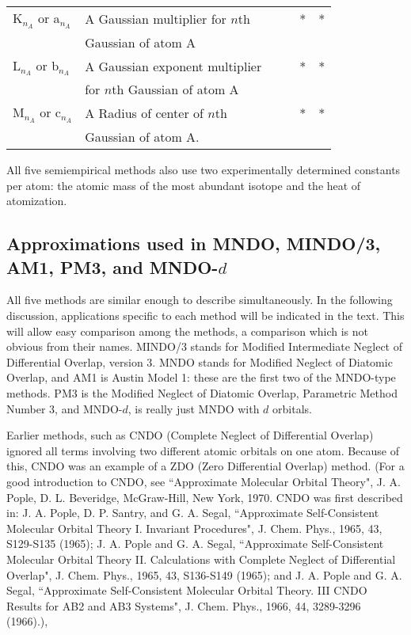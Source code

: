 \begin{table}
\begin{center}
\begin{tabular}{|l|l|cccc|}
K$_{n_A}$ or a$_{n_A}$ & A Gaussian multiplier for $n$th &  &&  *  &*  \\
&  Gaussian of atom A &&&& \\
L$_{n_A}$ or b$_{n_A}$ & A Gaussian exponent multiplier&   &&  * & *  \\
&  for $n$th Gaussian of atom A &&&& \\
M$_{n_A}$ or c$_{n_A}$ & A Radius of center of $n$th  && &   * & *  \\
&  Gaussian of atom A. &&&& \\ \hline
\end{tabular}
\end{center}
\end{table}

All five semiempirical methods also use two experimentally determined constants
per atom: the atomic mass of the most abundant isotope and the heat of
atomization.

\subsection{Approximations used in MNDO, MINDO/3, AM1, PM3, and MNDO-$d$}
All five methods are similar enough to describe simultaneously. In the
following discussion, applications specific to each method will be indicated in
the text. This will allow easy comparison among the methods, a comparison which
is not obvious from their names. MINDO/3 stands for Modified Intermediate
Neglect of Differential Overlap, version 3. MNDO stands for Modified Neglect of
Diatomic Overlap, and AM1 is Austin Model 1: these are the first two of  the
MNDO-type methods. PM3 is the Modified Neglect of Diatomic Overlap, Parametric
Method Number 3, and MNDO-$d$, is really just MNDO with $d$ orbitals.

Earlier methods, such as CNDO  (Complete Neglect of Differential Overlap) ignored all
terms involving two different atomic orbitals on one atom. Because of this, CNDO
was an example of a ZDO  (Zero Differential Overlap) method. (For a good
introduction to CNDO, see ``Approximate Molecular Orbital Theory", J. A. Pople,
D. L. Beveridge, McGraw-Hill, New York, 1970. CNDO was first described in: 
J. A. Pople, D. P. Santry, and G. A. Segal, ``Approximate Self-Consistent
Molecular Orbital Theory I. Invariant Procedures", J. Chem. Phys., 1965, 43,
S129-S135 (1965); J. A. Pople and G. A. Segal, ``Approximate Self-Consistent
Molecular Orbital Theory II. Calculations with Complete Neglect of Differential
 Overlap", J. Chem. Phys., 1965, 43, S136-S149 (1965); and J. A. Pople and
 G. A. Segal, ``Approximate Self-Consistent Molecular Orbital Theory. III CNDO
 Results for AB2 and AB3 Systems", J. Chem. Phys., 1966, 44, 3289-3296 (1966).),

